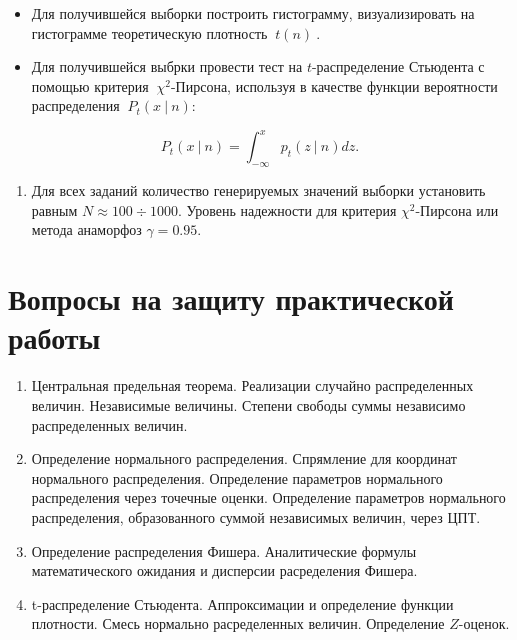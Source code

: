 \documentclass[
]{article}
\providecommand{\tightlist}{%
  \setlength{\itemsep}{0pt}\setlength{\parskip}{0pt}}
\begin{document}
\begin{itemize}
\item
  Для получившейся выборки построить гистограмму, визуализировать на
  гистограмме теоретическую плотность \(\ t(n)\ \).
\item
  Для получившейся выбрки провести тест на \(t\)-распределение Стьюдента
  с помощью критерия \(\ \chi^2\)-Пирсона, используя в качестве функции
  вероятности распределения \(\ P_t(x\ |\ n)\):
\end{itemize}

\[
P_t(x\ |\ n) = \int_{-\infty}^{x} p_t(z\ |\ n) dz.
\]

\begin{enumerate}
\def\labelenumi{\arabic{enumi}.}
\setcounter{enumi}{4}
\tightlist
\item
  Для всех заданий количество генерируемых значений выборки установить
  равным \(N \approx 100 \div 1000\). Уровень надежности для критерия
  \(\chi^2\)-Пирсона или метода анаморфоз \(\gamma = 0.95\).
\end{enumerate}

\hypertarget{ux432ux43eux43fux440ux43eux441ux44b-ux43dux430-ux437ux430ux449ux438ux442ux443-ux43fux440ux430ux43aux442ux438ux447ux435ux441ux43aux43eux439-ux440ux430ux431ux43eux442ux44b}{%
\section{\texorpdfstring{\textbf{Вопросы на защиту практической
работы}}{Вопросы на защиту практической работы}}\label{ux432ux43eux43fux440ux43eux441ux44b-ux43dux430-ux437ux430ux449ux438ux442ux443-ux43fux440ux430ux43aux442ux438ux447ux435ux441ux43aux43eux439-ux440ux430ux431ux43eux442ux44b}}

\begin{enumerate}
\def\labelenumi{\arabic{enumi}.}
\item
  Центральная предельная теорема. Реализации случайно распределенных
  величин. Независимые величины. Степени свободы суммы независимо
  распределенных величин.
\item
  Определение нормального распределения. Спрямление для координат
  нормального распределения. Определение параметров нормального
  распределения через точечные оценки. Определение параметров
  нормального распределения, образованного суммой независимых величин,
  через ЦПТ.
\item
  Определение распределения Фишера. Аналитические формулы
  математического ожидания и дисперсии расределения Фишера.
\item
  t-распределение Стьюдента. Аппроксимации и определение функции
  плотности. Смесь нормально расределенных величин. Определение
  \(Z\)-оценок.
\end{enumerate}
\end{document}
